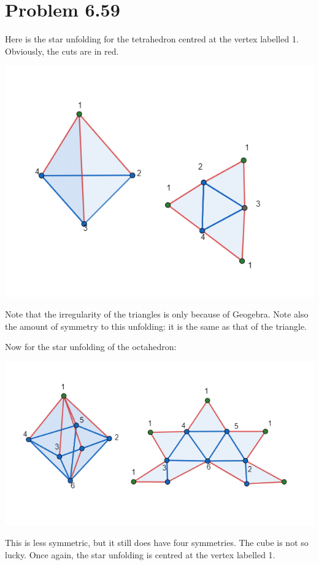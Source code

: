 \documentclass[12pt]{article}
\theoremstyle{definition}
\begin{document}
\section{Problem 6.59}

Here is the star unfolding for the tetrahedron centred at the vertex labelled 1. Obviously, the cuts are in red. 

\includegraphics[scale=0.5]{tetrahedron_unfolding.png}

Note that the irregularity of the triangles is only because of Geogebra. Note also the amount of symmetry to this unfolding: it is the same as that of the triangle. 

Now for the star unfolding of the octahedron:

\includegraphics[scale=0.5]{octahedron_unfolding.png} 

This is less symmetric, but it still does have four symmetries. The cube is not so lucky. Once again, the star unfolding is centred at the vertex labelled 1.
\end{document}
